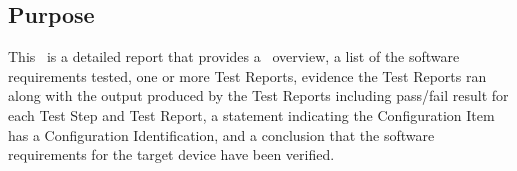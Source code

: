 \subsection{Purpose}
This \stdRptPkg\ is a detailed report that provides a \stdTestReport\
overview, a list of the software requirements tested, one or more Test
Reports, evidence the Test Reports ran along with the output produced by
the Test Reports including pass/fail result for each Test Step and
Test Report, a statement indicating the Configuration Item has a
Configuration Identification, and a conclusion that the software requirements
for the target device have been verified.
